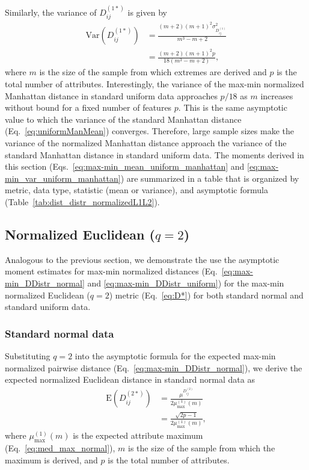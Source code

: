 \documentclass[aoas]{imsart}
\begin{document}
Similarly, the variance of $D^{(1*)}_{ij}$ is given by
%
\begin{equation}\label{eq:max-min_var_uniform_manhattan}
\begin{aligned}
\text{Var}\left(D^{(1*)}_{ij}\right) &= \frac{(m+2)(m+1)^2\sigma^2_{D^{(1)}_{ij}}}{m^3-m+2} \\
&= \frac{(m+2)(m+1)^2p}{18(m^3 - m + 2)},
\end{aligned}
\end{equation}
%
where $m$ is the size of the sample from which extremes are derived and $p$ is the total number of attributes. Interestingly, the variance of the max-min normalized Manhattan distance in standard uniform data approaches $p/18$ as $m$ increases without bound for a fixed number of features $p$. This is the same asymptotic value to which the variance of the standard Manhattan distance (Eq.~\ref{eq:uniformManMean}) converges. Therefore, large sample sizes make the variance of the normalized Manhattan distance approach the variance of the standard Manhattan distance in standard uniform data. The moments derived in this section (Eqs.~\ref{eq:max-min_mean_uniform_manhattan} and \ref{eq:max-min_var_uniform_manhattan}) are summarized in a table that is organized by metric, data type, statistic (mean or variance), and asymptotic formula (Table~\ref{tab:dist_distr_normalizedL1L2}).

\subsection{Normalized Euclidean \texorpdfstring{($q=2$)}{}}

Analogous to the previous section, we demonstrate the use the asymptotic moment estimates for max-min normalized distances (Eq.~\ref{eq:max-min_DDistr_normal} and \ref{eq:max-min_DDistr_uniform}) for the max-min normalized Euclidean ($q=2$) metric (Eq.~\ref{eq:D*}) for both standard normal and standard uniform data.

\subsubsection{Standard normal data}

Substituting $q=2$ into the asymptotic formula for the expected max-min normalized pairwise distance (Eq.~\ref{eq:max-min_DDistr_normal}), we derive the expected normalized Euclidean distance in standard normal data as
%
\begin{equation}\label{eq:max-min_mean_normal_euclidean}
\begin{aligned}
\text{E}\left(D^{(2*)}_{ij}\right) &= \frac{\mu^{D^{(2)}_{ij}}}{2\mu^{(1)}_\text{max}(m)} \\
&= \frac{\sqrt{2p - 1}}{2\mu^{(1)}_\text{max}(m)},
\end{aligned}
\end{equation}
%
where $\mu^{(1)}_\text{max}(m)$ is the expected attribute maximum (Eq.~\ref{eq:med_max_normal}), $m$ is the size of the sample from which the maximum is derived, and $p$ is the total number of attributes.
\end{document}
